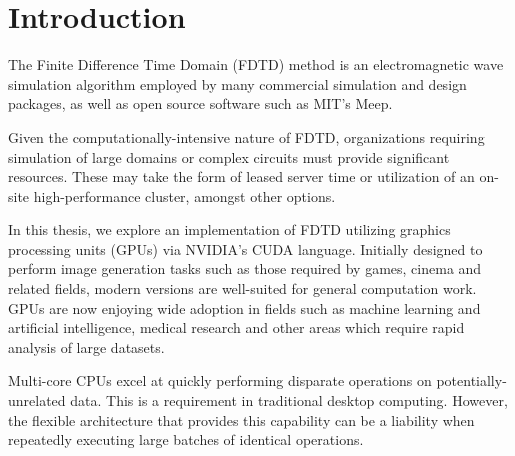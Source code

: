
\chapter{Introduction} \label{ch:introduction}


%
%



The Finite Difference Time Domain (FDTD)\cite{Yee} method is an electromagnetic wave simulation algorithm employed by many commercial simulation and design packages, as well as open source software such as MIT's Meep\cite{OskooiRo10}. 

Given the computationally-intensive nature of FDTD, organizations requiring simulation of large domains or complex circuits must provide significant resources. These may take the form of leased server time or utilization of an on-site high-performance cluster, amongst other options.

In this thesis, we explore an implementation of FDTD utilizing graphics processing units (GPUs) via NVIDIA's CUDA\cite{cuda} language. Initially designed to perform image generation tasks such as those required by games, cinema and related fields, modern versions are well-suited for general computation work. GPUs are now enjoying wide adoption in fields such as machine learning\cite{Raina09largescaledeep} and artificial intelligence\cite{wu2009clustering}, medical research\cite{QIMS1079} and other areas which require rapid analysis of large datasets.

Multi-core CPUs excel at quickly performing disparate operations on potentially-unrelated data. This is a requirement in traditional desktop computing. However, the flexible architecture that provides this capability can be a liability when repeatedly executing large batches of identical operations. 

